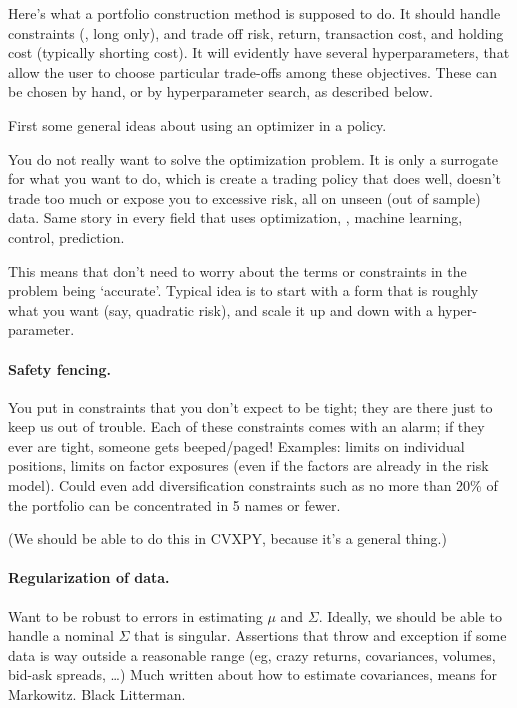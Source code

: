 \documentclass[12pt]{article}
\begin{document}
Here's what a portfolio construction method is supposed to do.
It should handle constraints (\eg, long only), and trade off risk,
return, transaction cost, and holding cost (typically shorting cost).
It will evidently have several hyperparameters, that allow the user
to choose particular trade-offs among these objectives.
These can be chosen by hand, or by hyperparameter search, as described below.

First some general ideas about using an optimizer in a policy.
\BIT
\item You do not really want to solve the optimization problem.  It is only a surrogate
for what you want to do, which is create a trading policy that does well, doesn't trade too much or 
expose you to excessive risk, all on unseen (out of sample) data.
Same story in every field that uses optimization, \eg, machine learning, control, prediction.
\item This means that don't need to worry about the terms or constraints in the problem being `accurate'.
Typical idea is to start with a form that is roughly what you want (say, quadratic risk), and scale 
it up and down with a hyper-parameter.
\EIT

\paragraph{Safety fencing.}  You put in constraints that you don’t expect to be tight;
they are there just to keep us out of trouble.  Each of these constraints comes
with an alarm; if they ever are tight, someone gets beeped/paged!  Examples:
limits on individual positions, limits on factor exposures (even if the factors
are already in the risk model). Could even add diversification constraints such
as no more than 20\% of the portfolio can be concentrated in 5 names or fewer.

(We should be able to do this in CVXPY, because it’s a general thing.)

\paragraph{Regularization of data.}  Want to be robust to errors in estimating $\mu$ and
$\Sigma$.  Ideally, we should be able to handle a nominal $\Sigma$ that is
singular. Assertions that throw and exception if some data is way outside a
reasonable range (eg, crazy returns, covariances, volumes, bid-ask spreads, …)
Much written about how to estimate covariances, means for Markowitz.  Black Litterman.
\end{document}
